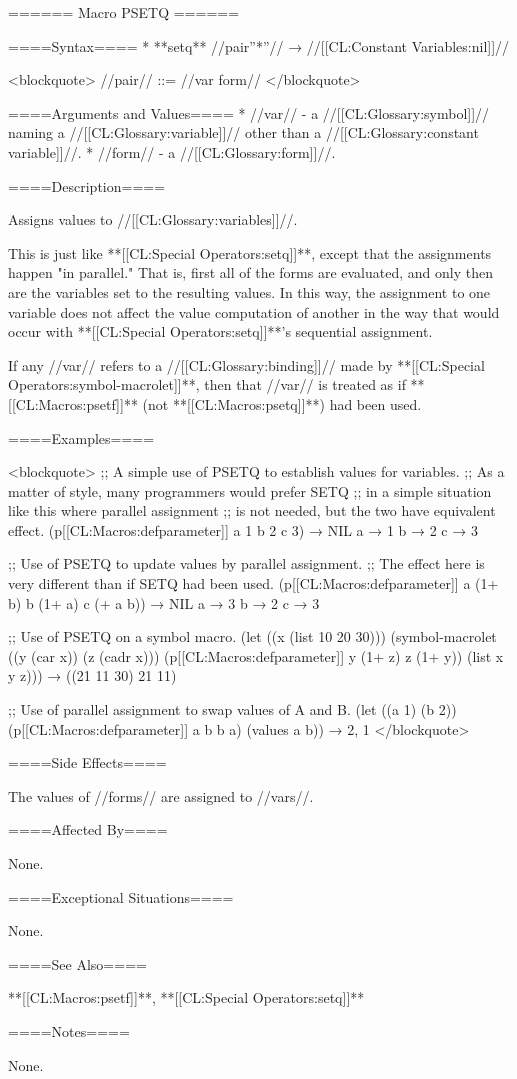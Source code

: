 ====== Macro PSETQ ======

====Syntax====
  * **setq** //{pair''*''}// → //[[CL:Constant Variables:nil]]//
  
<blockquote>
//pair// ::= //var form//
</blockquote>

====Arguments and Values====
  * //var// - a //[[CL:Glossary:symbol]]// naming a //[[CL:Glossary:variable]]// other than a //[[CL:Glossary:constant variable]]//.
  * //form// - a //[[CL:Glossary:form]]//.

====Description====

Assigns values to //[[CL:Glossary:variables]]//.

This is just like **[[CL:Special Operators:setq]]**, except that the assignments happen "in parallel." That is, first all of the forms are evaluated, and only then are the variables set to the resulting values. In this way, the assignment to one variable does not affect the value computation of another in the way that would occur with **[[CL:Special Operators:setq]]**'s sequential assignment.

If any //var// refers to a //[[CL:Glossary:binding]]// made by **[[CL:Special Operators:symbol-macrolet]]**, then that //var// is treated as if **[[CL:Macros:psetf]]** (not **[[CL:Macros:psetq]]**) had been used.

====Examples====

<blockquote> ;; A simple use of PSETQ to establish values for variables. ;; As a matter of style, many programmers would prefer SETQ ;; in a simple situation like this where parallel assignment ;; is not needed, but the two have equivalent effect. (p[[CL:Macros:defparameter]] a 1 b 2 c 3) → NIL a → 1 b → 2 c → 3

;; Use of PSETQ to update values by parallel assignment. ;; The effect here is very different than if SETQ had been used. (p[[CL:Macros:defparameter]] a (1+ b) b (1+ a) c (+ a b)) → NIL a → 3 b → 2 c → 3

;; Use of PSETQ on a symbol macro. (let ((x (list 10 20 30))) (symbol-macrolet ((y (car x)) (z (cadr x))) (p[[CL:Macros:defparameter]] y (1+ z) z (1+ y)) (list x y z))) → ((21 11 30) 21 11)

;; Use of parallel assignment to swap values of A and B. (let ((a 1) (b 2)) (p[[CL:Macros:defparameter]] a b b a) (values a b)) → 2, 1 </blockquote>

====Side Effects====

The values of //forms// are assigned to //vars//.

====Affected By====

None.

====Exceptional Situations====

None.

====See Also====

**[[CL:Macros:psetf]]**, **[[CL:Special Operators:setq]]**

====Notes====

None.

